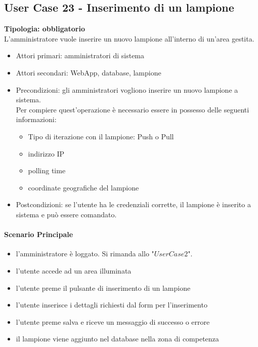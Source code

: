 \documentclass[12pt]{article}
\begin{document}
\subsection{User Case 23 - Inserimento di un lampione}
\textbf{Tipologia: obbligatorio}\\
L'amministratore vuole inserire un nuovo lampione all'interno di un'area gestita.
\begin{itemize}
	\item Attori primari: amministratori di sistema
	\item Attori secondari: WebApp, database, lampione
	\item Precondizioni: gli amministratori vogliono inserire un nuovo lampione a sistema.\\
	 Per compiere quest'operazione è necessario essere in possesso delle seguenti informazioni: 
	\begin{itemize}
		\item Tipo di iterazione con il lampione: Push o Pull
		\item indirizzo IP
		\item polling time
		\item coordinate geografiche del lampione
	\end{itemize}
	\item Postcondizioni: se l'utente ha le credenziali corrette, il lampione è inserito a sistema e può essere comandato.
\end{itemize}
\paragraph{Scenario Principale}
\begin{itemize}
	\item l'amministratore è loggato. Si rimanda allo "$User Case 2$".
	\item l'utente accede ad un area illuminata
	\item l'utente preme il pulsante di inserimento di un lampione
	\item l'utente inserisce i dettagli richiesti dal form per l'inserimento
	\item l'utente preme salva e riceve un messaggio di successo o errore
	\item il lampione viene aggiunto nel database nella zona di competenza
\end{itemize}
\end{document}
